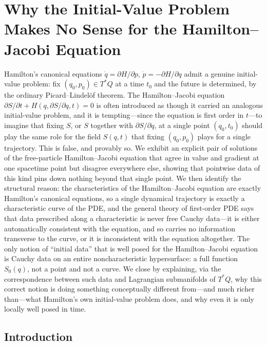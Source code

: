 \section{Why the Initial-Value Problem Makes No Sense for the Hamilton--Jacobi Equation}

Hamilton's canonical equations $\dot q=\partial H/\partial p$, $\dot
p=-\partial H/\partial q$ admit a genuine initial-value problem: fix
$(q_0,p_0)\in T^*Q$ at a time $t_0$ and the future is determined, by the
ordinary Picard--Lindel\"of theorem. The Hamilton--Jacobi equation $\partial
S/\partial t + H(q,\partial S/\partial q,t)=0$ is often introduced as though it
carried an analogous initial-value problem, and it is tempting---since the
equation is first order in $t$---to imagine that fixing $S$, or $S$ together
with $\partial S/\partial q$, at a single point $(q_0,t_0)$ should play the
same role for the field $S(q,t)$ that fixing $(q_0,p_0)$ plays for a single
trajectory. This is false, and provably so. We exhibit an explicit pair of
solutions of the free-particle Hamilton--Jacobi equation that agree in value
and gradient at one spacetime point but disagree everywhere else, showing that
pointwise data of this kind pins down nothing beyond that single point. We then
identify the structural reason: the characteristics of the Hamilton--Jacobi
equation are exactly Hamilton's canonical equations, so a single dynamical
trajectory is exactly a characteristic curve of the PDE, and the general theory
of first-order PDE says that data prescribed along a characteristic is never
free Cauchy data---it is either automatically consistent with the equation, and
so carries no information transverse to the curve, or it is inconsistent with
the equation altogether. The only notion of ``initial data'' that is well posed
for the Hamilton--Jacobi equation is Cauchy data on an entire noncharacteristic
hypersurface: a full function $S_0(q)$, not a point and not a curve. We close
by explaining, via the correspondence between such data and Lagrangian
submanifolds of $T^*Q$, why this correct notion is doing something conceptually
different from---and much richer than---what Hamilton's own initial-value
problem does, and why even it is only locally well posed in time.

\subsection{Introduction}
\label{intro}

